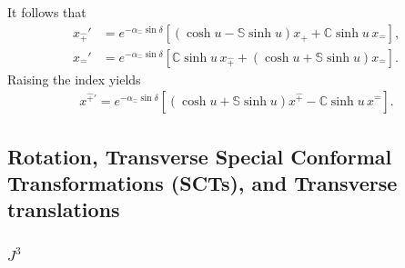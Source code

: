 \documentclass[foundations,article,submit,pdftex,moreauthors]{Definitions/mdpi}
\begin{document}
It follows that
\begin{align}
x_{\hat{+}}'&=e^{-\alpha_{\hat{-}}\sin\delta}
\left[\left(\cosh u-\mathbb{S}\sinh u\right)x_{\hat{+}}
 +\mathbb{C}\sinh u\,x_{\hat{-}}\right], \nonumber\\
x_{\hat{-}}'&=e^{-\alpha_{\hat{-}}\sin\delta}
\left[\mathbb{C}\sinh u\,x_{\hat{+}}
 +\left(\cosh u+\mathbb{S}\sinh u\right)x_{\hat{-}}\right].
\end{align}
Raising the index yields
\begin{align}
x^{\hat{+}\prime}
=e^{-\alpha_{\hat{-}}\sin\delta}
\left[\left(\cosh u+\mathbb{S}\sinh u\right)x^{\hat{+}}
 -\mathbb{C}\sinh u\,x^{\hat{-}}\right].
\end{align}

\subsection{Rotation, Transverse Special Conformal Transformations (SCTs), and Transverse translations}

\subsubsection{\texorpdfstring{$J^{3}$}{J3}}
\end{document}
